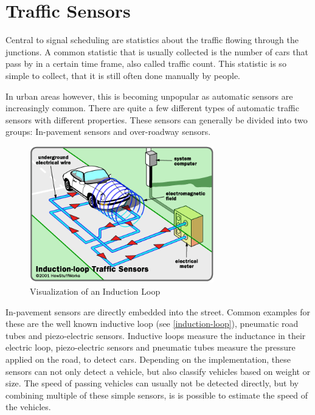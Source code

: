 \section{Traffic Sensors}
\label{trafficSensors}

Central to signal scheduling are statistics about the traffic flowing through the junctions. A common statistic that is usually collected is the number of cars that pass by in a certain time frame, also called traffic count. This statistic is so simple to collect, that it is still often done manually by people.

In urban areas however, this is becoming unpopular as automatic sensors are increasingly common. There are quite a few different types of automatic traffic sensors with different properties. These sensors can generally be divided into two groups: In-pavement sensors and over-roadway sensors. \cite{tmg}

\begin{figure}[ht]
	\centering
	\includegraphics[width=8cm]{figures/induction-loop}
	\caption[Visualization of an Induction Loop]{Visualization of an Induction Loop\protect\footnotemark}
	\label{induction-loop}
\end{figure}


In-pavement sensors are directly embedded into the street. Common examples for these are the well known inductive loop (see \autoref{induction-loop}), pneumatic road tubes and piezo-electric sensors. Inductive loops measure the inductance in their electric loop, piezo-electric sensors and pneumatic tubes measure the pressure applied on the road, to detect cars. Depending on the implementation, these sensors can not only detect a vehicle, but also classify vehicles based on weight or size. The speed of passing vehicles can usually not be detected directly, but by combining multiple of these simple sensors, is is possible to estimate the speed of the vehicles.


